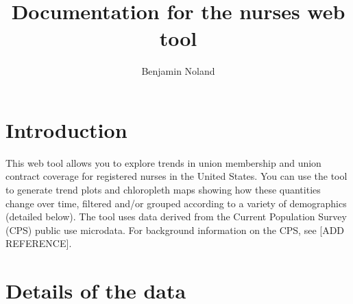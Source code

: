 \documentclass[letterpaper,12pt]{article}
\title{Documentation for the nurses web tool}
\author{Benjamin Noland}
\date{}
\begin{document}
\maketitle

\section*{Introduction}

This web tool allows you to explore trends in union membership and union contract coverage for 
registered nurses in the United States. You can use the tool to generate trend plots and 
chloropleth maps showing how these quantities change over time, filtered and/or grouped according 
to a variety of demographics (detailed below). The tool uses data derived from the Current 
Population Survey (CPS) public use microdata. For background information on the CPS, see [ADD 
REFERENCE].

\section*{Details of the data}
\end{document}

